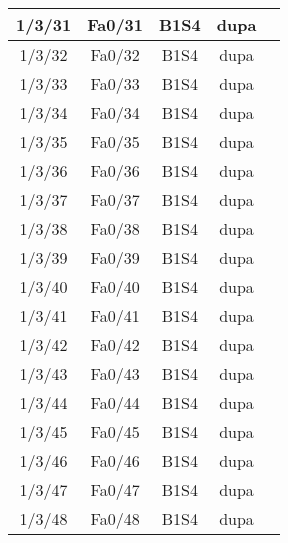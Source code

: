 \begin{center}
\begin{longtable}{|c|c|c|c|c|}
	1/3/31 & Fa0/31 & B1S4 & dupa \\ \hline
	1/3/32 & Fa0/32 & B1S4 & dupa \\ \hline
	1/3/33 & Fa0/33 & B1S4 & dupa \\ \hline
	1/3/34 & Fa0/34 & B1S4 & dupa \\ \hline
	1/3/35 & Fa0/35 & B1S4 & dupa \\ \hline
	1/3/36 & Fa0/36 & B1S4 & dupa \\ \hline
	1/3/37 & Fa0/37 & B1S4 & dupa \\ \hline
	1/3/38 & Fa0/38 & B1S4 & dupa \\ \hline
	1/3/39 & Fa0/39 & B1S4 & dupa \\ \hline
	1/3/40 & Fa0/40 & B1S4 & dupa \\ \hline
	1/3/41 & Fa0/41 & B1S4 & dupa \\ \hline
	1/3/42 & Fa0/42 & B1S4 & dupa \\ \hline
	1/3/43 & Fa0/43 & B1S4 & dupa \\ \hline
	1/3/44 & Fa0/44 & B1S4 & dupa \\ \hline
	1/3/45 & Fa0/45 & B1S4 & dupa \\ \hline
	1/3/46 & Fa0/46 & B1S4 & dupa \\ \hline
	1/3/47 & Fa0/47 & B1S4 & dupa \\ \hline
	1/3/48 & Fa0/48 & B1S4 & dupa \\ \hline
    \end{longtable}
\end{center}

